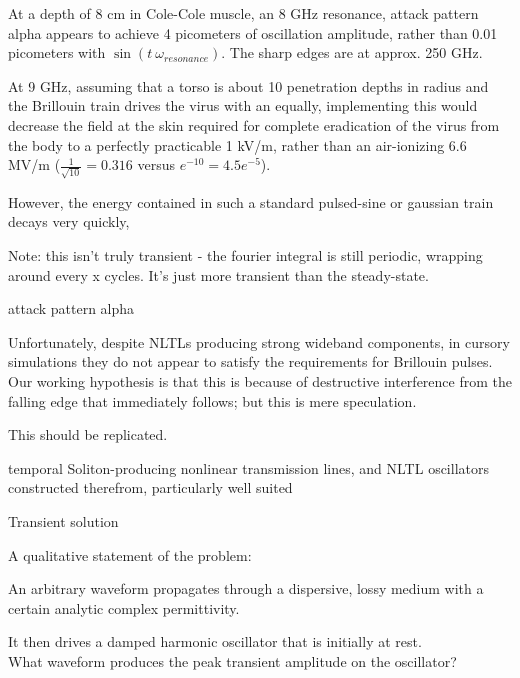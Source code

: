 \documentclass[paper.tex]{subfiles}
\begin{document}




At a depth of 8 cm in Cole-Cole muscle, an 8 GHz resonance, attack pattern alpha appears to achieve 4 picometers of oscillation amplitude, rather than 0.01 picometers with $\sin(t\ \omega_{resonance})$. The sharp edges are at approx. 250 GHz. 



At 9 GHz, assuming that a torso is about 10 penetration depths in radius and the Brillouin train 
drives the virus with an equally, implementing this would decrease the field at the skin required 
for complete eradication of the virus from the body to a perfectly practicable 1 kV/m, rather than 
an air-ionizing 6.6 MV/m ($\frac{1}{\sqrt{10}}=0.316$ versus $e^{-10}=4.5e^{-5}$). 

However, the energy contained in such a standard pulsed-sine or gaussian train decays very quickly, 







Note: this isn't truly transient - the fourier integral is still periodic, wrapping around every x cycles. It's just more transient than the steady-state.




attack pattern alpha


Unfortunately, despite NLTLs producing strong wideband components, in cursory simulations they do 
not appear to satisfy the requirements for Brillouin pulses. Our working hypothesis is that this is 
because of destructive interference from the falling edge that immediately follows; but this is 
mere speculation.
\begin{autem}
	This should be replicated.
\end{autem}

temporal Soliton-producing nonlinear transmission lines, and NLTL oscillators constructed therefrom, particularly well suited 


Transient solution

\pagebreak
A qualitative statement of the problem:

\begin{toolchain}
An arbitrary waveform propagates through a dispersive, lossy medium with a certain analytic complex 
permittivity. 

It then drives a damped harmonic oscillator that is initially at rest.\\

What waveform produces the peak transient amplitude on the oscillator?
\end{toolchain}
\end{document}
